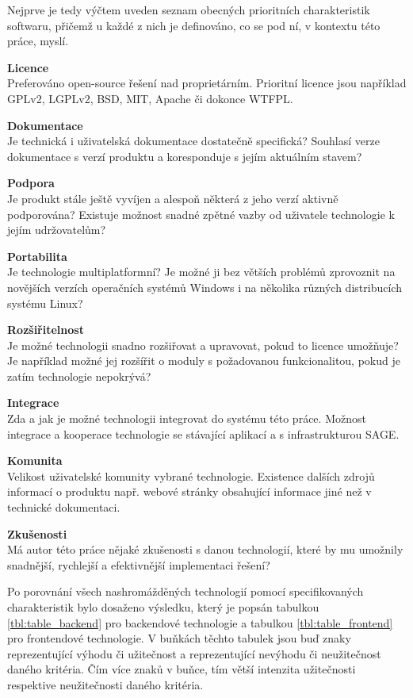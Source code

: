 \documentclass[thesis=M,czech]{FITthesis}[2012/06/26]
\begin{document}
	Nejprve je tedy výčtem uveden seznam obecných prioritních charakteristik softwaru, přičemž u každé z nich je definováno, co se pod ní, v kontextu této práce, myslí.

\begin{description}
\item \textbf{Licence\\}
Preferováno open-source řešení nad proprietárním. Prioritní licence jsou například GPLv2, LGPLv2, BSD, MIT, Apache či dokonce WTFPL.
\item \textbf{Dokumentace\\}
Je technická i uživatelská dokumentace dostatečně specifická? Souhlasí verze dokumentace s verzí produktu a koresponduje s jejím aktuálním stavem?
\item \textbf{Podpora\\}
Je produkt stále ještě vyvíjen a alespoň některá z jeho verzí aktivně podporována? Existuje možnost snadné zpětné vazby od uživatele technologie k jejím udržovatelům?
\item \textbf{Portabilita\\}
Je technologie multiplatformní? Je možné ji bez větších problémů zprovoznit na novějších verzích operačních systémů Windows i na několika různých distribucích systému Linux?
\item \textbf{Rozšiřitelnost\\}
Je možné technologii snadno rozšiřovat a upravovat, pokud to licence umožňuje? Je například možné jej rozšířit o moduly s požadovanou funkcionalitou, pokud je zatím technologie nepokrývá?
\item \textbf{Integrace\\}
Zda a jak je možné technologii integrovat do systému této práce. Možnost integrace a kooperace technologie se stávající aplikací a s infrastrukturou SAGE.
\item \textbf{Komunita\\}
Velikost uživatelské komunity vybrané technologie. Existence dalších zdrojů informací o produktu např. webové stránky obsahující informace jiné než v technické dokumentaci.
\item \textbf{Zkušenosti\\}
Má autor této práce nějaké zkušenosti s danou technologií, které by mu umožnily snadnější, rychlejší a efektivnější implementaci řešení?
\end{description}

Po porovnání všech nashromážděných technologií pomocí specifikovaných charakteristik bylo dosaženo výsledku, který je popsán tabulkou \ref{tbl:table_backend} pro backendové technologie a tabulkou \ref{tbl:table_frontend} pro frontendové technologie. V buňkách těchto tabulek jsou buď znaky \uv{+} reprezentující výhodu či užitečnost a \uv{-} reprezentující nevýhodu či neužitečnost daného kritéria. Čím více znaků v buňce, tím větší intenzita užitečnosti respektive neužitečnosti daného kritéria.
\end{document}
